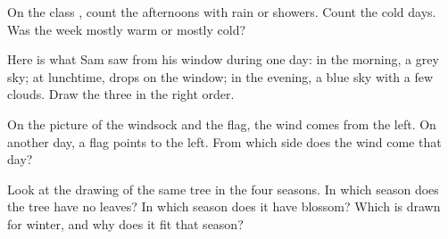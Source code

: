 \begin{exercise}[$\star\star$]\label{exo:g1:watching-the-weather:8}
On the class , count the afternoons with rain or showers.
Count the cold days. Was the week mostly warm or mostly cold?
\end{exercise}

\begin{exercise}[$\star\star$]\label{exo:g1:watching-the-weather:9}
Here is what Sam saw from his window during one day: in the morning, a grey
sky; at lunchtime, drops on the window; in the evening, a blue sky with a
few clouds. Draw the three  in the right order.
\end{exercise}

\begin{exercise}[$\star\star$]\label{exo:g1:watching-the-weather:10}
On the picture of the windsock and the flag, the wind comes from the left.
On another day, a flag points to the left. From which side does the wind
come that day?
\end{exercise}

\begin{exercise}[$\star\star$]\label{exo:g1:watching-the-weather:11}
Look at the drawing of the same tree in the four seasons. In which season
does the tree have no leaves? In which season does it have blossom? Which
 is drawn for winter, and why does it fit that season?
\end{exercise}
